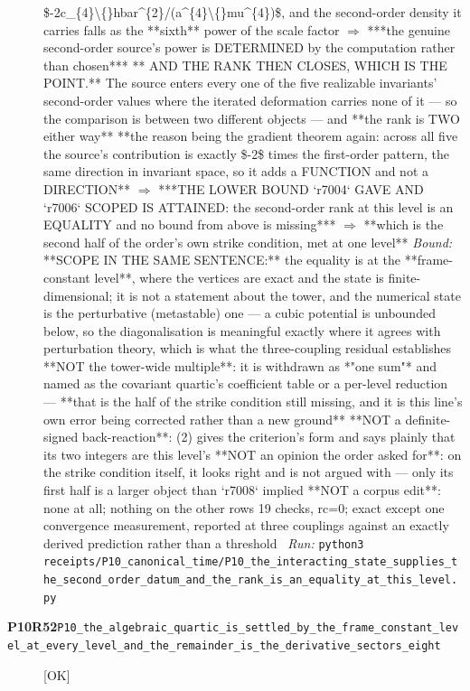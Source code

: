 \begin{description}
\$-2c\_\{4\}\textbackslash\{\}hbar\textasciicircum{}\{2\}/(a\textasciicircum{}\{4\}\textbackslash\{\}mu\textasciicircum{}\{4\})\$, and the second-order density it carries falls as the **sixth** power of the scale factor \ensuremath{\Rightarrow} ***the genuine second-order source's power is DETERMINED by the computation rather than chosen***  ** AND THE RANK THEN CLOSES, WHICH IS THE POINT.** The source enters every one of the five realizable invariants' second-order values where the iterated deformation carries none of it --- so the comparison is between two different objects --- and **the rank is TWO either way**  **the reason being the gradient theorem again: across all five the source's contribution is exactly \$-2\$ times the first-order pattern, the same direction in invariant space, so it adds a FUNCTION and not a DIRECTION** \ensuremath{\Rightarrow} ***THE LOWER BOUND `r7004` GAVE AND `r7006` SCOPED IS ATTAINED: the second-order rank at this level is an EQUALITY and no bound from above is missing*** \ensuremath{\Rightarrow} **which is the second half of the order's own strike condition, met at one level**
 \emph{Bound:}  **SCOPE IN THE SAME SENTENCE:** the equality is at the **frame-constant level**, where the vertices are exact and the state is finite-dimensional; it is not a statement about the tower, and the numerical state is the perturbative (metastable) one --- a cubic potential is unbounded below, so the diagonalisation is meaningful exactly where it agrees with perturbation theory, which is what the three-coupling residual establishes  **NOT the tower-wide multiple**: it is withdrawn as *"one sum"* and named as the covariant quartic's coefficient table or a per-level reduction --- **that is the half of the strike condition still missing, and it is this line's own error being corrected rather than a new ground**  **NOT a definite-signed back-reaction**: (2) gives the criterion's form and says plainly that its two integers are this level's  **NOT an opinion the order asked for**: on the strike condition itself, it looks right and is not argued with --- only its first half is a larger object than `r7008` implied  **NOT a corpus edit**: none at all; nothing on the other rows  19 checks, rc=0; exact except one convergence measurement, reported at three couplings against an exactly derived prediction rather than a threshold
\ \emph{Run:} \texttt{python3 receipts/P10\_canonical\_time/P10\_the\_interacting\_state\_supplies\_the\_second\_order\_datum\_and\_the\_rank\_is\_an\_equality\_at\_this\_level.py}
\item[\rcptlabel{P10_the_algebraic_quartic_is_settled_by_the_frame_constant_level_at_every_level_and_the_remainder_is_the_derivative_sectors_eight}{P10R52}\textbf{P10R52}\quad\texttt{P10\_the\_algebraic\_quartic\_is\_settled\_by\_the\_frame\_constant\_level\_at\_every\_level\_and\_the\_remainder\_is\_the\_derivative\_sectors\_eight}]\hfill\textsf{[OK]}\\

\end{description}
